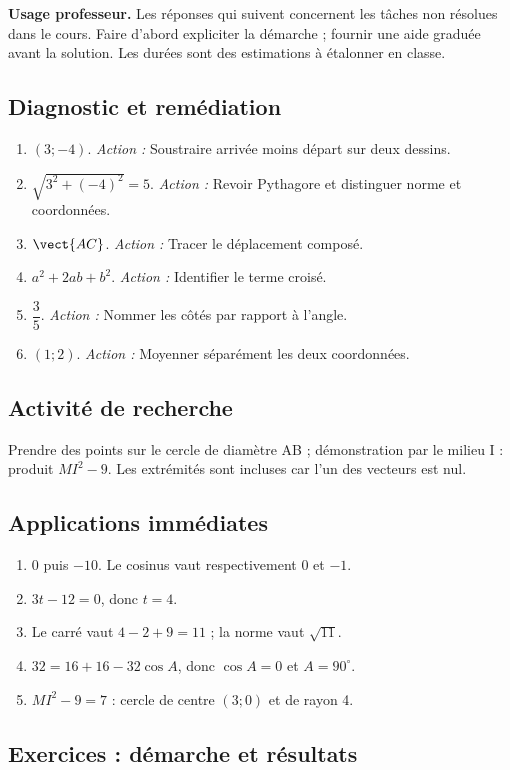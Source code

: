 \label{C03-CORR}
\textbf{Usage professeur.} Les réponses qui suivent concernent les tâches non résolues dans le cours. Faire d’abord expliciter la démarche ; fournir une aide graduée avant la solution. Les durées sont des estimations à étalonner en classe.
\subsection*{Diagnostic et remédiation}
\begin{enumerate}
\item $(3;-4)$. \textit{Action :} Soustraire arrivée moins départ sur deux dessins.
\item $\sqrt{3^2+(-4)^2}=5$. \textit{Action :} Revoir Pythagore et distinguer norme et coordonnées.
\item $\vect{AC}$. \textit{Action :} Tracer le déplacement composé.
\item $a^2+2ab+b^2$. \textit{Action :} Identifier le terme croisé.
\item $\dfrac{3}{5}$. \textit{Action :} Nommer les côtés par rapport à l’angle.
\item $(1;2)$. \textit{Action :} Moyenner séparément les deux coordonnées.
\end{enumerate}
\subsection*{Activité de recherche}
Prendre des points sur le cercle de diamètre AB ; démonstration par le milieu I : produit $MI^2-9$. Les extrémités sont incluses car l’un des vecteurs est nul.
\subsection*{Applications immédiates}
\begin{enumerate}
\item $0$ puis $-10$. Le cosinus vaut respectivement 0 et $-1$.
\item $3t-12=0$, donc $t=4$.
\item Le carré vaut $4-2+9=11$ ; la norme vaut $\sqrt{11}$.
\item $32=16+16-32\cos A$, donc $\cos A=0$ et $A=90^\circ$.
\item $MI^2-9=7$ : cercle de centre $(3;0)$ et de rayon 4.
\end{enumerate}
\subsection*{Exercices : démarche et résultats}
